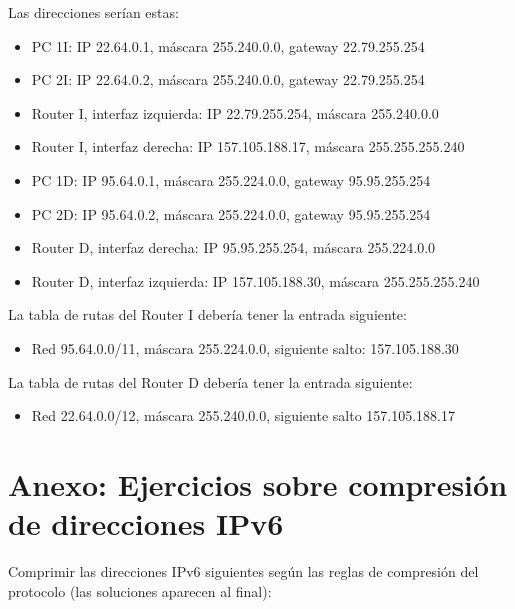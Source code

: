 \documentclass[letterpaper,10pt,spanish]{sphinxmanual}
\begin{document}
\sphinxAtStartPar
Las direcciones serían estas:
\begin{itemize}
\item {} 
\sphinxAtStartPar
PC 1I: IP 22.64.0.1, máscara 255.240.0.0, gateway 22.79.255.254

\item {} 
\sphinxAtStartPar
PC 2I: IP 22.64.0.2, máscara 255.240.0.0, gateway 22.79.255.254

\item {} 
\sphinxAtStartPar
Router I, interfaz izquierda: IP 22.79.255.254, máscara 255.240.0.0

\item {} 
\sphinxAtStartPar
Router I, interfaz derecha: IP 157.105.188.17, máscara 255.255.255.240

\item {} 
\sphinxAtStartPar
PC 1D: IP 95.64.0.1, máscara 255.224.0.0, gateway 95.95.255.254

\item {} 
\sphinxAtStartPar
PC 2D: IP 95.64.0.2, máscara 255.224.0.0, gateway 95.95.255.254

\item {} 
\sphinxAtStartPar
Router D, interfaz derecha: IP 95.95.255.254, máscara 255.224.0.0

\item {} 
\sphinxAtStartPar
Router D, interfaz izquierda: IP 157.105.188.30, máscara 255.255.255.240

\end{itemize}

\sphinxAtStartPar
La tabla de rutas del Router I debería tener la entrada siguiente:
\begin{itemize}
\item {} 
\sphinxAtStartPar
Red 95.64.0.0/11, máscara 255.224.0.0, siguiente salto: 157.105.188.30

\end{itemize}

\sphinxAtStartPar
La tabla de rutas del Router D debería tener la entrada siguiente:
\begin{itemize}
\item {} 
\sphinxAtStartPar
Red 22.64.0.0/12, máscara 255.240.0.0, siguiente salto 157.105.188.17

\end{itemize}


\chapter{Anexo: Ejercicios sobre compresión de direcciones IPv6}
\label{\detokenize{t2_integracion_elementos/ejerciciosipv6/ejercicios_ipv6:anexo-ejercicios-sobre-compresion-de-direcciones-ipv6}}\label{\detokenize{t2_integracion_elementos/ejerciciosipv6/ejercicios_ipv6::doc}}
\sphinxAtStartPar
Comprimir las direcciones IPv6 siguientes según las reglas de compresión del protocolo (las soluciones aparecen al final):
\end{document}
